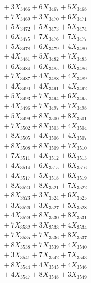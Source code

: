 \documentclass[a4paper,10pt]{article}
\begin{document}
{\begin{align}
&\;  + 3 X_{3466} + 6 X_{3467} + 5 X_{3468} \\[0.3ex]
&\;  + 7 X_{3469} + 3 X_{3470} + 6 X_{3471} \\[0.3ex]
&\;  + 5 X_{3472} + 5 X_{3473} + 5 X_{3474} \\[0.3ex]
&\;  + 6 X_{3475} + 7 X_{3476} + 7 X_{3477} \\[0.3ex]
&\;  + 5 X_{3478} + 6 X_{3479} + 4 X_{3480} \\[0.3ex]
&\;  + 4 X_{3481} + 5 X_{3482} + 7 X_{3483} \\[0.3ex]
&\;  + 6 X_{3484} + 6 X_{3485} + 6 X_{3486} \\[0.3ex]
&\;  + 7 X_{3487} + 4 X_{3488} + 4 X_{3489} \\[0.5ex]\allowbreak
&\;  + 4 X_{3490} + 4 X_{3491} + 4 X_{3492} \\[0.3ex]
&\;  + 5 X_{3493} + 7 X_{3494} + 6 X_{3495} \\[0.3ex]
&\;  + 4 X_{3496} + 7 X_{3497} + 7 X_{3498} \\[0.3ex]
&\;  + 5 X_{3499} + 8 X_{3500} + 8 X_{3501} \\[0.3ex]
&\;  + 7 X_{3502} + 8 X_{3503} + 4 X_{3504} \\[0.3ex]
&\;  + 8 X_{3505} + 4 X_{3506} + 4 X_{3507} \\[0.3ex]
&\;  + 8 X_{3508} + 8 X_{3509} + 7 X_{3510} \\[0.3ex]
&\;  + 7 X_{3511} + 4 X_{3512} + 6 X_{3513} \\[0.3ex]
&\;  + 4 X_{3514} + 6 X_{3515} + 6 X_{3516} \\[0.3ex]
&\;  + 4 X_{3517} + 5 X_{3518} + 6 X_{3519} \\[0.5ex]\allowbreak
&\;  + 8 X_{3520} + 8 X_{3521} + 7 X_{3522} \\[0.3ex]
&\;  + 8 X_{3523} + 3 X_{3524} + 6 X_{3525} \\[0.3ex]
&\;  + 3 X_{3526} + 3 X_{3527} + 5 X_{3528} \\[0.3ex]
&\;  + 4 X_{3529} + 8 X_{3530} + 8 X_{3531} \\[0.3ex]
&\;  + 7 X_{3532} + 3 X_{3533} + 4 X_{3534} \\[0.3ex]
&\;  + 7 X_{3535} + 7 X_{3536} + 8 X_{3537} \\[0.3ex]
&\;  + 8 X_{3538} + 7 X_{3539} + 4 X_{3540} \\[0.3ex]
&\;  + 3 X_{3541} + 7 X_{3542} + 7 X_{3543} \\[0.3ex]
&\;  + 8 X_{3544} + 4 X_{3545} + 4 X_{3546} \\[0.3ex]
&\;  + 4 X_{3547} + 8 X_{3548} + 3 X_{3549} \\[0.5ex]\allowbreak

\end{align}}
\end{document}
